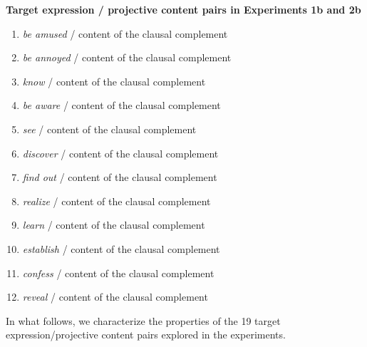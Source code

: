 \documentclass[11pt,fleqn]{article}
\newcommand{\6}{\mbox{$[\hspace*{-.6mm}[$}}
\newcommand{\9}{\mbox{$]\hspace*{-.6mm}]$}}
\begin{document}
\begin{exe}
\begin{enumerate}[itemsep=-.5mm]
\end{enumerate}


\ex\label{pairs1b2b} {\bf Target expression / projective content pairs in Experiments 1b and 2b}

\begin{enumerate}[itemsep=-.5mm]

\item {\em be amused} / content of the clausal complement

\item {\em be annoyed} / content of the clausal complement

\item {\em know} / content of the clausal complement

\item {\em be aware} / content of the clausal complement

\item {\em see} / content of the clausal complement

\item {\em discover} / content of the clausal complement

\item {\em find out} / content of the clausal complement

\item {\em realize} / content of the clausal complement

\item {\em learn} / content of the clausal complement

\item {\em establish} / content of the clausal complement

\item {\em confess} / content of the clausal complement

\item {\em reveal} / content of the clausal complement

\end{enumerate}

\end{exe}

In what follows, we characterize the properties of the 19 target expression/projective content pairs explored in the experiments.
\end{document}
